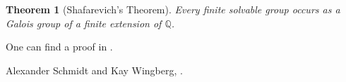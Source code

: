 \documentclass[12pt]{article}
\newtheorem*{thm}{Theorem}
\newcommand{\Rats}{\mathbb{Q}}
\begin{document}
\begin{thm}[Shafarevich's Theorem]
Every finite solvable group occurs as a Galois group of a finite extension of $\Rats$.
\end{thm}

One can find a proof in \cite{hgm}.

\begin{thebibliography}{HGM02} %

Alexander Schmidt and Kay Wingberg, .

\end{thebibliography}
\end{document}
